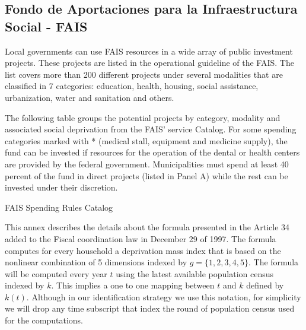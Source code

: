 \documentclass[dv_diss_main.tex]{subfiles}
\begin{document}

\normalsize
\normalfont



\subsection{Fondo de Aportaciones para la Infraestructura Social - FAIS}

\label{ap:faisspending}

Local governments can use FAIS resources in a wide array of public investment projects. These projects are listed in the operational guideline of the FAIS. The list covers more than 200 different projects under several modalities that are classified in 7 categories: education, health, housing, social assistance, urbanization, water and sanitation and others. 

The following table groups the potential projects by category, modality and associated social deprivation from the FAIS' service Catalog. For some spending categories marked with * (medical stall, equipment and medicine supply), the fund can be invested  if resources for the operation of the dental or health centers are provided by the federal government. Municipalities must spend at least 40 percent of the fund in direct projects (listed in Panel A) while the rest can be invested under their discretion.


\begin{table}[H]
	\centering
	\small
	\caption{FAIS Spending Rules Catalog}\label{fig:discon}
	\label{trends_inf}
	\resizebox{\textwidth}{!}{
		
				}		
\parbox{\textwidth}{\small 
\vspace{2eX}
\footnotesize	
 \spendingcatalog
  
}
\end{table}

 \label{ap:faisformula}

This annex describes the details about the formula presented in the Article 34 added to the Fiscal coordination law in December 29 of 1997. The formula computes for every household a deprivation mass index that is based on the nonlinear combination of 5 dimensions indexed by $g=\{1,2,3,4,5\}$. The formula will be computed every year $t$ using the latest available population census indexed by $k$. This implies a one to one mapping between $t$ and $k$ defined by $k(t)$. Although in our identification strategy we use this notation, for simplicity we will drop any time subscript that index the round of population census used for the computations.
\end{document}

